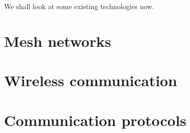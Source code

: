 We shall look at some existing technologies now.

\section{Mesh networks}

\section{Wireless communication}

\section{Communication protocols}